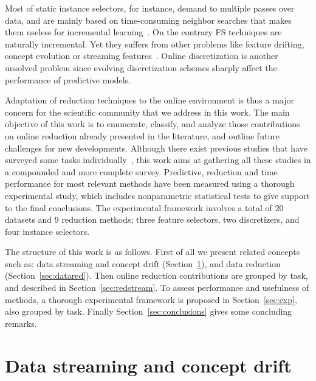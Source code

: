 \documentclass[preprint,12pt]{elsarticle}
\begin{document}
Most of static instance selectors, for instance, demand to multiple passes over data, and are mainly based on time-consuming neighbor searches that makes them useless for incremental learning~\cite{garcia14}. On the contrary FS techniques are naturally incremental. Yet they suffers from other problems like feature drifting, concept evolution or streaming features~\cite{masud10}. Online discretization is another unsolved problem since evolving discretization schemes sharply affect the performance of predictive models. 

Adaptation of reduction techniques to the online environment is thus a major concern for the scientific community that we address in this work. The main objective of this work is to enumerate, classify, and analyze those contributions on online reduction already presented in the literature, and outline future challenges for new developments. Although there exist previous studies that have surveyed some tasks individually~\cite{bolon15, lu16}, this work aims at gathering all these studies in a compounded and more complete survey. Predictive, reduction and time performance for most relevant methods have been measured using a thorough experimental study, which includes nonparametric statistical tests to give support to the final conclusions. The experimental framework involves a total of 20 datasets and 9 reduction methods; three feature selectors, two discretizers, and four instance selectors.


The structure of this work is as follows. First of all we present related concepts such as: data streaming and concept drift (Section~\ref{sec:stream}), and data reduction (Section~\ref{sec:datared}). Then online reduction contributions are grouped by task, and described in Section~\ref{sec:redstream}. To assess performance and usefulness of methods, a thorough experimental framework is proposed in Section~\ref{sec:exp}, also grouped by task. Finally Section~\ref{sec:conclusions} gives some concluding remarks.

\section{Data streaming and concept drift}
\label{sec:stream}
\end{document}

